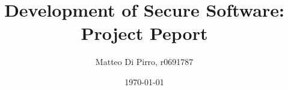 \documentclass[a4paper,10pt]{article}
\begin{document}
\title{Development of Secure Software: Project Peport}
\author{Matteo Di Pirro, r0691787}
\date{\today}

\maketitle






\end{document}

